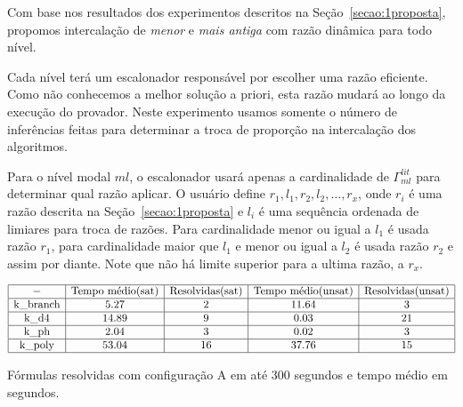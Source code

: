 Com base nos resultados dos experimentos descritos na Seção~\ref{secao:1proposta}, propomos intercalação de \textit{menor} e \textit{mais antiga} com razão dinâmica para todo nível.

Cada nível terá um escalonador responsável por escolher uma razão eficiente. Como não conhecemos a melhor solução a priori, esta razão mudará ao longo da execução do provador. Neste experimento usamos somente o número de inferências feitas para determinar a troca de proporção na intercalação dos algoritmos.

Para o nível modal $ml$, o escalonador usará apenas a cardinalidade de $\Gamma^{lit}_{ml}$ para determinar qual razão aplicar. O usuário define $r_1, l_1, r_2, l_2, \ldots, r_x$, onde $r_i$ é uma razão descrita na Seção~\ref{secao:1proposta} e $l_i$ é uma sequência ordenada de limiares para troca de razões. Para cardinalidade menor ou igual a $l_1$ é usada razão $r_1$, para cardinalidade maior que $l_1$ e menor ou igual a $l_2$ é usada razão $r_2$ e assim por diante. Note que não há limite superior para a ultima razão, a $r_x$.

\begin{table*}[t]
	\[
\begin{array}{|c|c|c|c|c|}
	\hline - & \textnormal{Tempo médio(sat)} & \textnormal{Resolvidas(sat)} & \textnormal{Tempo médio(unsat)} & \textnormal{Resolvidas(unsat)} \\
	
	\hline \textnormal{k\_branch} & 5.27 & 2 & 11.64 & 3 \\
	\hline \textnormal{k\_d4} & 14.89 & 9 & 0.03 & 21 \\
	\hline \textnormal{k\_ph} & 2.04 & 3 & 0.02 & 3 \\
	\hline \textnormal{k\_poly} & 53.04 & 16 & 37.76 & 15 \\
	
	\hline
	
\end{array}
	\]
\caption{Fórmulas resolvidas com configuração A em até 300 segundos e tempo médio em segundos.}
\label{table:300threshold1}
\end{table*}




